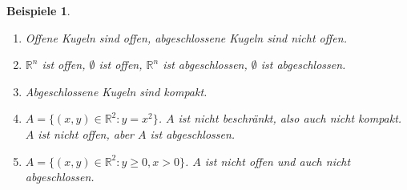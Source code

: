 \documentclass[12pt]{extreport} %
\newcommand{\R}{\mathbb{R}}
\theoremstyle{named}
\theoremstyle{dotless}
\newtheorem*{beispiele}{Beispiele}
\begin{document}
\begin{beispiele} ~\
	\begin{enumerate}
		\item Offene Kugeln sind offen, abgeschlossene Kugeln sind nicht offen.
		\item $\R^{n}$ ist offen, $\emptyset$ ist offen, $\R^{n}$ ist abgeschlossen, $\emptyset$ ist abgeschlossen.
		\item Abgeschlossene Kugeln sind kompakt.
		\item $A = \{ (x, y) \in \R^{2}: y = x^{2} \}$. $A$ ist nicht beschränkt, also auch nicht kompakt. $A$ ist nicht offen, aber $A$ ist abgeschlossen.
		\item $A = \{ (x, y) \in \R^{2} : y \geq 0, x > 0 \}$. $A$ ist nicht offen und auch nicht abgeschlossen.
	\end{enumerate}
\end{beispiele}


\appendix 

\renewcommand{\indexname}{Stichwortverzeichnis}
\printindex
\end{document}
